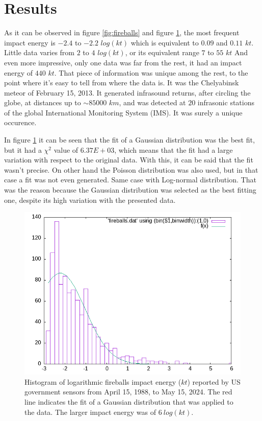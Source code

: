\documentclass[
	a4paper, %
	10pt, %
	unnumberedsections, %
	twoside, %
]{LTJournalArticle}
\begin{document}
\section{Results}

As it can be observed in figure \ref{fig:fireballs} and figure \ref{fig:gaussian}, the most frequent
impact energy is $-2.4$ to $-2.2$ $log(kt)$ which is equivalent to $0.09$ and $0.11$ $kt$. Little
data varies from $2$ to $4$ $log(kt)$, or its equivalent range $7$ to $55$ $kt$ And even more
impressive, only one data was far from the rest, it had an impact energy of $440$ $kt$. That piece of
information was unique among the rest, to the point where it's easy to tell from where the data is. It
was the Chelyabinsk meteor of February 15, 2013. It generated infrasound returns, after circling the
globe, at distances up to $\sim85000$ $km$, and was detected at $20$ infrasonic stations of the global
International Monitoring System (IMS). \supercite{rusia2013} It was surely a unique occurence.

In figure \ref{fig:gaussian} it can be seen that the fit of a Gaussian distribution was the best fit,
but it had a $\chi^2$ value of $6.37E+03$, which means that the fit had a large variation with respect to
the original data. With this, it can be said that the fit wasn't precise. On other hand the Poisson
distribution was also used, but in that case a fit was not even generated. Same case with Log-normal
distribution. That was the reason because the Gaussian distribution was selected as the best fitting
one, despite its high variation with the presented data.

\begin{figure}[H] %
	\includegraphics[width=\linewidth]{fit.png}
	\caption{Histogram of logarithmic fireballs impact energy ($kt$) reported by US government sensors from April 15, 1988, to May 15, 2024. The red line indicates the fit of a Gaussian distribution that was applied to the data. The larger impact energy was of $6\:log(kt)$.}
	\label{fig:gaussian}
\end{figure}
\end{document}
